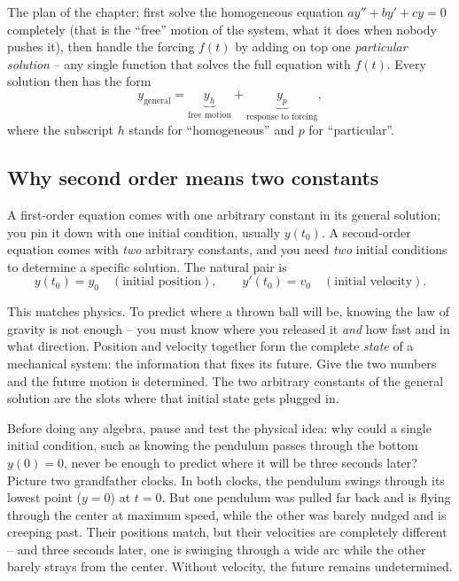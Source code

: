 \begin{focusbox}
The plan of the chapter: first solve the homogeneous
equation $a y'' + b y' + c y = 0$ completely (that is the ``free'' motion of the
system, what it does when nobody pushes it), then handle the forcing $f(t)$ by
adding on top one \emph{particular solution} -- any single function that solves
the full equation with $f(t)$. Every solution then has the form
\[
  y_{\text{general}} = \underbrace{y_h}_{\text{free motion}} + \underbrace{y_p}_{\text{response to forcing}},
\]
where the subscript $h$ stands for ``homogeneous'' and $p$ for ``particular''.
\end{focusbox}

\subsection*{Why second order means two constants}

A first-order equation comes with one arbitrary constant in its general
solution; you pin it down with one initial condition, usually $y(t_0)$. A
second-order equation comes with \emph{two} arbitrary constants, and you need
\emph{two} initial conditions to determine a specific solution. The natural pair
is
\[
  y(t_0) = y_0 \quad(\text{initial position}), \qquad
  y'(t_0) = v_0 \quad(\text{initial velocity}).
\]

\begin{intuitionbox}
This matches physics. To predict where a thrown ball will be,
knowing the law of gravity is not enough -- you must know where you released it
\emph{and} how fast and in what direction. Position and velocity together form
the complete \emph{state} of a mechanical system: the information that fixes its
future. Give the two numbers and the future motion is determined. The two
arbitrary constants of the general solution are the slots
where that initial state gets plugged in.
\end{intuitionbox}

\begin{walkbox}
Before doing any algebra, pause and test the physical idea: why could a single
initial condition, such as knowing the pendulum passes through the bottom
$y(0) = 0$, never be enough to predict where it will be three seconds later?
Picture two grandfather clocks. In both clocks, the pendulum swings through its
lowest point ($y = 0$) at $t = 0$. But one pendulum was pulled far back and
is flying through the center at maximum speed, while the other was barely nudged
and is creeping past. Their positions match, but their velocities are completely
different -- and three seconds later, one is swinging through a wide arc while the
other barely strays from the center. Without velocity, the future remains
undetermined.
\end{walkbox}

